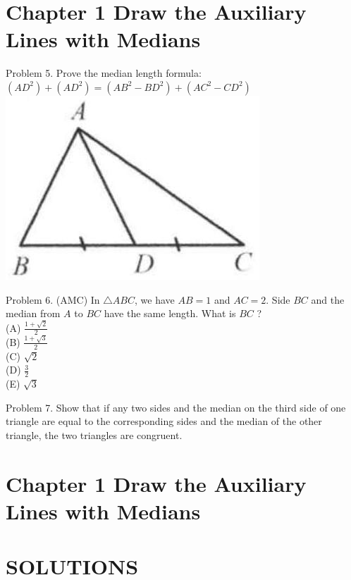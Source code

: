 \documentclass[10pt]{article}
\begin{document}
\section*{Chapter 1 Draw the Auxiliary Lines with Medians}
Problem 5. Prove the median length formula:\\
\(\left(A D^{2}\right)+\left(A D^{2}\right)=\left(A B^{2}-B D^{2}\right)+\left(A C^{2}-C D^{2}\right)\)\\
\includegraphics[max width=\textwidth, center]{2025_04_17_97bc1f7e44d93c271a88g-028}

Problem 6. (AMC) In \(\triangle A B C\), we have \(A B=1\) and \(A C=2\). Side \(B C\) and the median from \(A\) to \(B C\) have the same length. What is \(B C\) ?\\
(A) \(\frac{1+\sqrt{2}}{2}\)\\
(B) \(\frac{1+\sqrt{3}}{2}\)\\
(C) \(\sqrt{2}\)\\
(D) \(\frac{3}{2}\)\\
(E) \(\sqrt{3}\)

Problem 7. Show that if any two sides and the median on the third side of one triangle are equal to the corresponding sides and the median of the other triangle, the two triangles are congruent.

\section*{Chapter 1 Draw the Auxiliary Lines with Medians}
\section*{SOLUTIONS}
\end{document}
